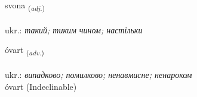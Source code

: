 \documentclass[frontgrid, backgrid]{flacards}\usepackage[]{graphicx}\usepackage[]{xcolor}
\begin{document}
\renewcommand{\flhead}{\vskip5pt \fboxsep=0pt {\small\bfseries\footnotesize Lýsingarorð | прикметник}}
\renewcommand{\fcfoot}{\vskip5pt \fboxsep=0pt \hspace{2pt}{\small\bfseries\footnotesize 2K}}

\renewcommand{\blhead}{\vskip5pt {\small\bfseries\footnotesize Lýsingarorð | прикметник }}
\renewcommand{\bcfoot}{\vskip5pt \hspace{2pt}{\small\bfseries\footnotesize 2K}}


{svona \small{\textsubscript{(\textit{adj.})}} \\[1ex] %
\textphonetic{[svɔːna]} \\
ukr.: \emph{такий; тиким чином; настільки} \\  [2ex]
\renewcommand*{\arraystretch}{0.8}
}


\renewcommand{\flhead}{\vskip5pt \fboxsep=0pt {\small\bfseries\footnotesize Atviksorð | прислівник}}
\renewcommand{\fcfoot}{\vskip5pt \fboxsep=0pt \hspace{2pt}{\small\bfseries\footnotesize 2K}}

\renewcommand{\blhead}{\vskip5pt {\small\bfseries\footnotesize Atviksorð | прислівник }}
\renewcommand{\bcfoot}{\vskip5pt \hspace{2pt}{\small\bfseries\footnotesize 2K}}


{óvart \small{\textsubscript{(\textit{adv.})}} \\[1ex]
\textphonetic{[ouːvar̥t]} \\
ukr.: \emph{випадково; помилково; ненавмисне; ненароком} \\  [2ex]
óvart (Indeclinable)}
\end{document}
